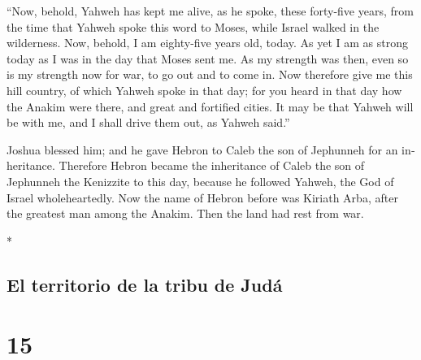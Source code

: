 \begin{paracol}{2}
\begin{otherlanguage}{english}
 ``Now, behold, Yahweh has kept me alive, as he spoke,
these forty-five years, from the time that Yahweh spoke this word to
Moses, while Israel walked in the wilderness. Now, behold, I am
eighty-five years old, today.  As yet I am as strong
today as I was in the day that Moses sent me. As my strength was then,
even so is my strength now for war, to go out and to come in.
 Now therefore give me this hill country, of which Yahweh
spoke in that day; for you heard in that day how the Anakim were there,
and great and fortified cities. It may be that Yahweh will be with me,
and I shall drive them out, as Yahweh said.''

 Joshua blessed him; and he gave Hebron to Caleb the son
of Jephunneh for an inheritance.  Therefore Hebron became
the inheritance of Caleb the son of Jephunneh the Kenizzite to this day,
because he followed Yahweh, the God of Israel wholeheartedly.
 Now the name of Hebron before was Kiriath Arba, after
the greatest man among the Anakim. Then the land had rest from war.

\end{otherlanguage}

\switchcolumn[0]*

\hypertarget{el-territorio-de-la-tribu-de-juduxe1}{%
\subsection{El territorio de la tribu de
Judá}\label{el-territorio-de-la-tribu-de-juduxe1}}

\hypertarget{section-28}{%
\section{15}\label{section-28}}


\end{paracol}
